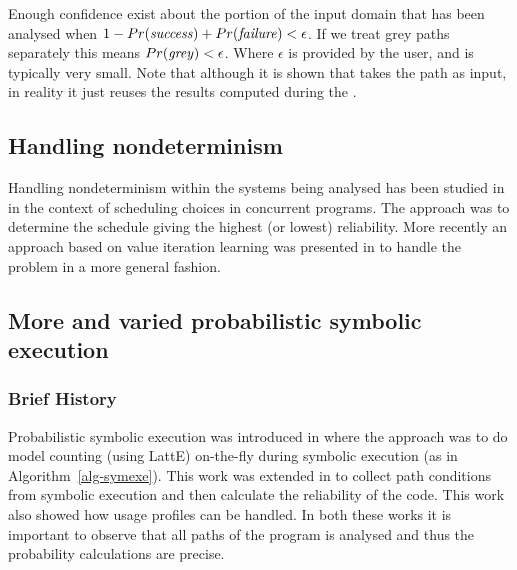 Enough confidence exist about the portion of the input domain that has been analysed when  $1 - Pr(\mathit{success}) + Pr(\mathit{failure}) < \epsilon$.  If we treat grey paths separately this means $Pr(\mathit{grey}) < \epsilon$. Where $\epsilon$ is provided by the user, and is typically very small. Note that although it is shown that  takes the path as input, in reality it just reuses the results computed during the . 





\subsection{Handling nondeterminism}

Handling nondeterminism within the systems being analysed has been studied in \cite{filieri2013reliability} in the context of scheduling choices in concurrent programs. The approach was to determine the schedule giving the highest (or lowest) reliability. More recently an approach based on value iteration learning was presented in \cite{luckow2014exact} to handle the problem in a more general fashion.

\subsection{More and varied probabilistic symbolic execution}

\subsubsection{Brief History}
Probabilistic symbolic execution was introduced in \cite{Geldenhuys2012} where the approach was to do model counting (using LattE) on-the-fly during symbolic execution (as in Algorithm~\ref{alg-symexe}). This work was extended in \cite{filieri2013reliability} to collect path conditions from symbolic execution and then calculate the reliability of the code. This work also showed how usage profiles can be handled. In both these works it is important to observe that all paths of the program is analysed and thus the probability calculations are precise. 

